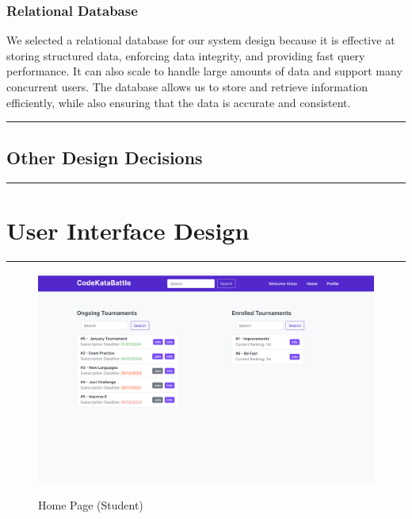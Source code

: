 \documentclass{Configuration_Files/Template}
\begin{document}
\subsection{Relational Database}

We selected a relational database for our system design because it is effective at storing structured data, enforcing data integrity, and providing fast query performance. It can also scale to handle large amounts of data and support many concurrent users. The database allows us to store and retrieve information efficiently, while also ensuring that the data is accurate and consistent.
{\color{bluepoli}\rule{\linewidth}{0.1pt}}

\section{Other Design Decisions}

{\color{bluepoli}\rule{\linewidth}{0.1pt}}


\chapter{User Interface Design}

{\color{bluepoli}\rule{\linewidth}{0.1pt}}

\begin{figure}[H]
\centering
\includegraphics[scale = 0.25]{DD_latex/Images/UI/MainPage_Student.png}\\
\caption{Home Page (Student)}
\end{figure}
\end{document}
